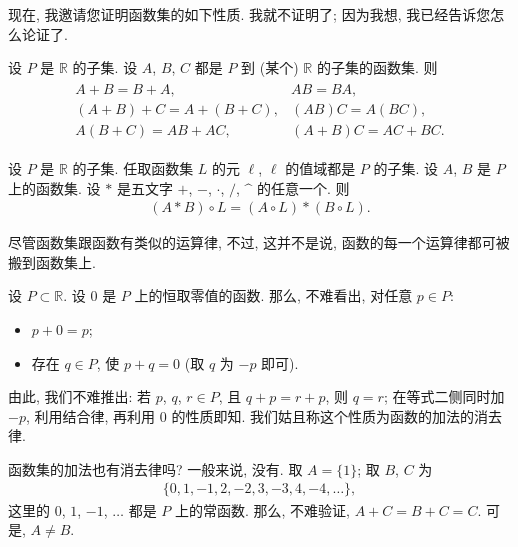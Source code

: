 现在, 我邀请您证明函数集的如下性质. 我就不证明了; 因为我想, 我已经告诉您怎么论证了.

\begin{theorem}
    设 $P$ 是 $\mathbb{R}$ 的子集. 设 $A$, $B$, $C$ 都是 $P$ 到 (某个) $\mathbb{R}$ 的子集的函数集. 则
    \begin{align*}
        \begin{array}{ll}
            A + B = B + A,             & AB = BA,            \\
            (A + B) + C = A + (B + C), & (AB)C = A(BC),      \\
            A(B + C) = AB + AC,        & (A + B)C = AC + BC.
        \end{array}
    \end{align*}
\end{theorem}

\begin{theorem}
    设 $P$ 是 $\mathbb{R}$ 的子集. 任取函数集 $L$ 的元 $\ell$, $\ell$ 的值域都是 $P$ 的子集. 设 $A$, $B$ 是 $P$ 上的函数集. 设 $\ast$ 是五文字 $+$, $-$, $\cdot$, $/$, $\text{\textasciicircum}$ 的任意一个. 则
    \begin{align*}
        (A \ast B) \circ L = (A \circ L) \ast (B \circ L).
    \end{align*}
\end{theorem}

尽管函数集跟函数有类似的运算律, 不过, 这并不是说, 函数的每一个运算律都可被搬到函数集上.

\begin{example}
    设 $P \subset \mathbb{R}$. 设 $0$ 是 $P$ 上的恒取零值的函数. 那么, 不难看出, 对任意 $p \in P$:
    \begin{itemize}
        \item $p + 0 = p$;
        \item 存在 $q \in P$, 使 $p + q = 0$ (取 $q$ 为 $-p$ 即可).
    \end{itemize}
    由此, 我们不难推出: 若 $p$, $q$, $r \in P$, 且 $q + p = r + p$, 则 $q = r$; 在等式二侧同时加 $-p$, 利用结合律, 再利用 $0$ 的性质即知. 我们姑且称这个性质为函数的加法的消去律.

    函数集的加法也有消去律吗? 一般来说, 没有. 取 $A = \{ 1 \}$; 取 $B$, $C$ 为
    \begin{align*}
        \{ 0, 1, -1, 2, -2, 3, -3, 4, -4, \dots \},
    \end{align*}
    这里的 $0$, $1$, $-1$, $\dots$ 都是 $P$ 上的常函数. 那么, 不难验证, $A + C = B + C = C$. 可是, $A \neq B$.
\end{example}


